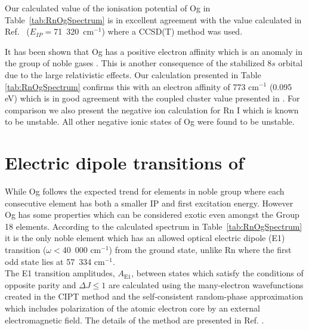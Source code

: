 \documentclass[10pt,a4paper, twoside]{report}
\begin{document}
Our calculated value of the ionisation potential of Og in Table~\ref{tab:RnOgSpectrum} is in excellent agreement with the value calculated in Ref.~\cite{Jerabek2018} ($E_{IP}=$71~320~cm$^{-1}$) where a CCSD(T) method was used.  

It has been shown that Og has a positive electron affinity which is an anomaly in the group of noble gases \cite{EliavOg1996, Goidenko2003, Eliav2015}. This is another consequence of the stabilized $8s$ orbital due to the large relativistic effects. Our calculation presented in Table \ref{tab:RnOgSpectrum}  confirms this with an electron affinity of 773 cm$^{-1}$ (0.095 eV) which is in good agreement with the coupled cluster value presented in \cite{Goidenko2003}. For comparison we also present the negative ion calculation for Rn I which is known to be unstable. All other negative ionic states of Og were found to be unstable.

\section{Electric dipole transitions of} \label{sec:E1}
 While Og  follows the expected trend for elements in noble group where each consecutive element has both a smaller IP and first excitation energy. However Og has some properties which can be considered exotic even amongst the Group 18 elements. According to the calculated spectrum in Table~\ref{tab:RnOgSpectrum} it is the only noble element which has an allowed optical electric dipole (E1) transition ($\omega < $40~000 cm$^{-1}$) from the ground state, unlike Rn where the first odd state lies at 57~334 cm$^{-1}$. \\
 
 The E1 transition amplitudes, $A_{\text{E1}}$, between states which satisfy the conditions of opposite parity and $\Delta J \leq 1$   are calculated using the many-electron wavefunctions created in the CIPT method and the self-consistent random-phase approximation which 
includes polarization of  the atomic electron core by an external electromagnetic field. The details  of the method are presented  in Ref. \cite{Dzuba2018}. \\
 
\end{document}
